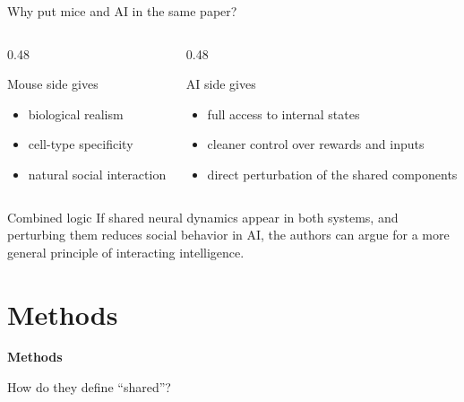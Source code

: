 \documentclass[aspectratio=169,11pt]{beamer}
\newcommand{\sectiondivider}[2]{
  \begin{frame}[plain]
    \vfill
    {\color{accentblue}\LARGE\bfseries #1\par}
    \vspace{0.5em}
    {\large #2\par}
    \vfill
  \end{frame}
}
\begin{document}
\begin{frame}{Why put mice and AI in the same paper?}
\begin{columns}[T]
  \begin{column}{0.48\textwidth}
    \begin{block}{Mouse side gives}
    \begin{itemize}
      \item biological realism
      \item cell-type specificity
      \item natural social interaction
    \end{itemize}
    \end{block}
  \end{column}
  \begin{column}{0.48\textwidth}
    \begin{block}{AI side gives}
    \begin{itemize}
      \item full access to internal states
      \item cleaner control over rewards and inputs
      \item direct perturbation of the shared components
    \end{itemize}
    \end{block}
  \end{column}
\end{columns}
\vspace{0.4em}
\begin{alertblock}{Combined logic}
If shared neural dynamics appear in both systems, and perturbing them reduces social behavior in AI, the authors can argue for a more general principle of interacting intelligence.
\end{alertblock}
\end{frame}

\section{Methods}
\sectiondivider{Methods}{How do they define ``shared''?}
\end{document}
